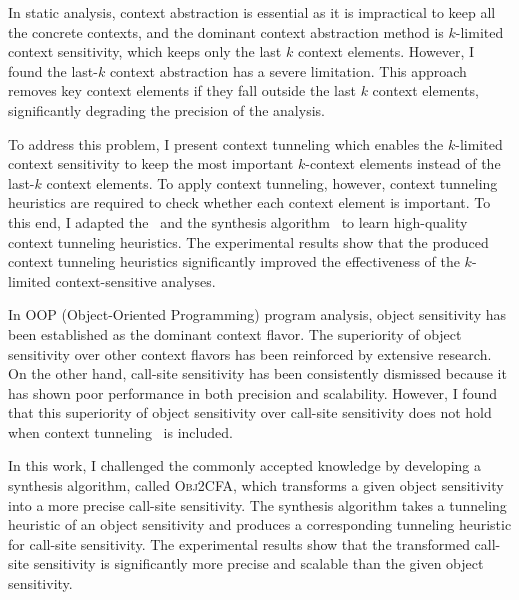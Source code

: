 \documentclass[11pt]{article}
\newcommand{\myparagraph}[1]{\medskip\noindent{\it \textbf{#1.}}}
\begin{document}
\myparagraph{Context Tunneling~\cite{JeJeOh18}}
%
In static analysis, context abstraction is essential as it is impractical to keep all the concrete contexts, and the dominant context abstraction method is $k$-limited context sensitivity, which keeps only the last $k$ context elements.
%
However, I found the last-$k$ context abstraction has a severe limitation. 
%
This approach removes key context elements if they fall outside the last $k$ context elements, significantly degrading the precision of the analysis.




To address this problem, I present context tunneling which enables the $k$-limited context sensitivity to keep the most important $k$-context elements instead of the last-$k$ context elements.
%
To apply context tunneling, however, context tunneling heuristics are required to check whether each context element is important.
%
To this end, I adapted the \DisjunctiveModel~and the synthesis algorithm~\cite{JeJeChOh17} to learn high-quality context tunneling heuristics.
%
The experimental results show that the produced context tunneling heuristics significantly improved the effectiveness of the $k$-limited context-sensitive analyses.




\myparagraph{Obj2CFA~\cite{JeOh22}}
%
In OOP (Object-Oriented Programming) program analysis, object sensitivity has been established as the dominant context flavor.
%
The superiority of object sensitivity over other context flavors has been reinforced by extensive research.
%
On the other hand, call-site sensitivity has been consistently dismissed because it has shown poor performance in both precision and scalability.
%
However, I found that this superiority of object sensitivity over call-site sensitivity does not hold when context tunneling~\cite{JeJeOh18} is included.


In this work, I challenged the commonly accepted knowledge by developing a synthesis algorithm, called \textsc{Obj2CFA}, which transforms a given object sensitivity into a more precise call-site sensitivity.
%
The synthesis algorithm takes a tunneling heuristic of an object sensitivity and produces a corresponding tunneling heuristic for call-site sensitivity.
%
The experimental results show that the transformed call-site sensitivity is significantly more precise and scalable than the given object sensitivity.
\end{document}
